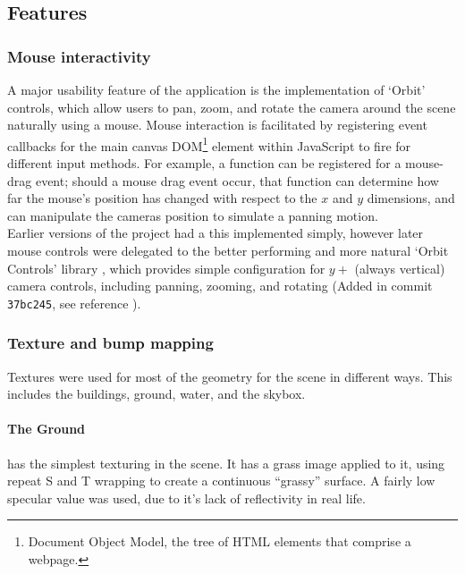     \subsection{Features} %
    \label{sub:features}
        \subsubsection{Mouse interactivity} %
        \label{ssub:mouse_interactivity}
            A major usability feature of the application is the implementation of `Orbit' controls, which allow users to pan, zoom, and rotate the camera around the scene naturally using a mouse.
            Mouse interaction is facilitated by registering event callbacks for the main canvas DOM\footnote{Document Object Model, the tree of HTML elements that comprise a webpage.} element within JavaScript to fire for different input methods.
            For example, a function can be registered for a mouse-drag event;  should a mouse drag event occur, that function can determine how far the mouse's position has changed with respect to the $x$ and $y$ dimensions, and can manipulate the cameras position to simulate a panning motion.\\

            Earlier versions of the project had a this implemented simply, however later mouse controls were delegated to the better performing and more natural `Orbit Controls' library \cite{three_orbit}, which provides simple configuration for $y+$ (always vertical) camera controls, including panning, zooming, and rotating (Added in commit \texttt{37bc245}, see reference \cite{cranny_src}).


        \subsubsection{Texture and bump mapping} %
        \label{ssub:texture_and_bump_mapping}
            Textures were used for most of the geometry for the scene in different ways.
            This includes the buildings, ground, water, and the skybox.

            \paragraph{The Ground} %
            \label{par:the_ground}
                has the simplest texturing in the scene.
                It has a grass image applied to it, using repeat S and T wrapping to create a continuous ``grassy'' surface.
                A fairly low specular value was used, due to it's lack of reflectivity in real life.

